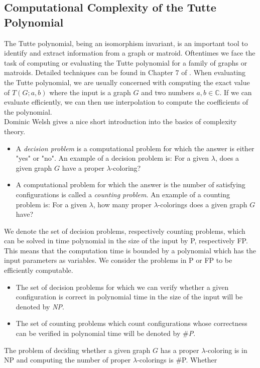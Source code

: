 \documentclass[12pt,a4paper, twoside, autooneside=false]{scrartcl}
\theoremstyle{definition}
\theoremstyle{remark}
\numberwithin{equation}{section}
\begin{document}
\subsection{Computational Complexity of the Tutte Polynomial}
The Tutte polynomial, being an isomorphism invariant, is an important tool to identify and extract information from a graph or matroid. Oftentimes we face the task of computing  or evaluating the Tutte polynomial for a family of graphs or matroids. Detailed techniques can be found in Chapter 7 of \cite{ElMo2022}. When evaluating the Tutte polynomial, we are usually concerned with computing the exact value of $T(G;a,b)$ where the input is a graph $G$ and two numbers $a,b \in \mathbb{C}$. If we can evaluate efficiently, we can then use interpolation to compute the coefficients of the polynomial. \\ 
\indent Dominic Welsh \cite{Wel1993} gives a nice short introduction into the basics of complexity theory.
\begin{itemize}
\item[]A \textit{decision problem} is a computational problem for which the answer is either "yes" or "no". An example of a decision problem is: For a given $\lambda$, does a given graph $G$ have a proper $\lambda$-coloring?
\item[]A computational problem for which the answer is the number of satisfying configurations is called a \textit{counting problem}. An example of a counting problem is: For a given $\lambda$, how many proper $\lambda$-colorings does a given graph $G$ have?
\end{itemize} We denote the set of decision problems, respectively counting problems, which can be solved in time polynomial in the size of the input by P, respectively FP. This means that the computation time is bounded by a polynomial which has the input parameters as variables. We consider the problems in P or FP to be efficiently computable.
\begin{itemize}
\item[]The set of decision problems for which we can verify whether a given configuration is correct in polynomial time in the size of the input will be denoted by \textit{NP}. 
\item[]The set of counting problems which count configurations whose correctness can be verified in polynomial time will be denoted by $\#$\textit{P}.
\end{itemize}
 The problem of deciding whether a given graph $G$ has a proper $\lambda$-coloring is in NP and computing the number of proper $\lambda$-colorings is $\#$P. Whether 
\end{document}

